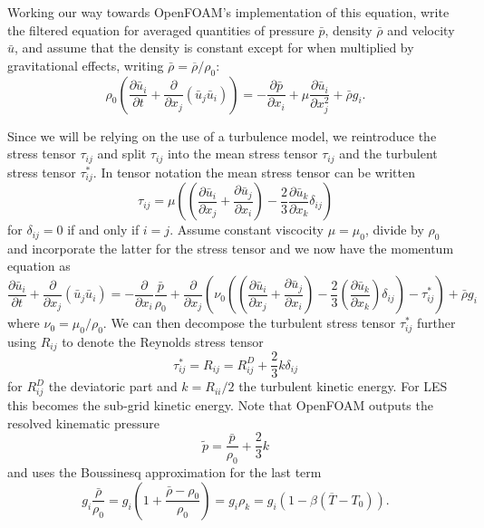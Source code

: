 \documentclass[12pt]{report}
\begin{document}
Working our way towards OpenFOAM's implementation of this equation, write the filtered equation for averaged quantities of pressure $\bar{p}$, density $\bar{\rho}$ and velocity $\bar{u}$, and assume that the density is constant except for when multiplied by gravitational effects, writing $\bar{\rho} = \overline{\rho} / \rho _0$:
\begin{equation} \rho _0 \left ( \frac{\partial \bar{u}_i}{\partial t} + \frac{\partial}{\partial x_j} \left( \bar{u}_j \bar{u}_i \right) \right )
= -\frac{\partial \bar{p}} {\partial{x_i}} +  \mu \frac{\partial \bar{u}_i}{\partial x_j^2} + \bar{\rho} g_i. \end{equation}

Since we will be relying on the use of a turbulence model, we reintroduce the stress tensor $\tau _{ij}$ and split $\tau_{ij}$ into the mean stress tensor $\tau _{ij}$ and the turbulent stress tensor $\tau ^* _{ij}$.
In tensor notation the mean stress tensor can be written
\begin{equation*} \tau _{ij} = \mu \left ( \left ( \frac{\partial \bar{u} _i}{\partial x_j} + \frac{\partial \bar{u} _j }{\partial x_i} \right) - \frac{2}{3} \frac{\partial \bar{u}_k} {\partial x_k} \delta _{ij} \right ) \end{equation*}
for $\delta _{ij} = 0$ if and only if $i=j$.
Assume constant viscocity $\mu = \mu _0$, divide by $\rho _0$ and incorporate the latter for the stress tensor and we now have the momentum equation as
\begin{equation*} \frac{\partial \bar{u}_i}{\partial t} + \frac{\partial}{\partial x_j} \left( \bar{u}_j \bar{u}_i \right) 
= -\frac{\partial } {\partial{x_i}} \frac{\bar{p}}{\rho_0} + \frac{\partial }{\partial x_j} \left ( \nu _0 \left ( \left ( \frac{\partial \bar{u}_i} {\partial x_j} + \frac{\partial \bar{u} _j}{\partial x_i} \right ) - \frac{2}{3}\left ( \frac{\partial \bar{u} _k}{\partial x_k }\right ) \delta _{ij}\right ) - \tau ^* _{ij} \right ) + \bar{\rho} g_i \end{equation*}
where $\nu _0 = \mu _0 /\rho _0$.
We can then decompose the turbulent stress tensor $\tau ^* _{ij}$ further using $R_{ij}$ to denote the Reynolds stress tensor
\begin{equation*} \tau ^* _{ij} = R_{ij} = R^D _{ij} + \frac{2}{3} k \delta _{ij} \end{equation*}
for $R_{ij}^D$ the deviatoric part and $k = R_{ii}/2$ the turbulent kinetic energy.
For LES this becomes the sub-grid kinetic energy.
Note that OpenFOAM outputs the resolved kinematic pressure
\begin{equation*} \tilde{p} = \frac{\bar{p} }{\rho _0} + \frac{2}{3}k \end{equation*}
and uses the Boussinesq approximation for the last term
\begin{equation*} g_i\frac{\bar{\rho}}{\rho _0} = g_i \left ( 1 + \frac{\bar{\rho} - \rho _0}{\rho _0} \right ) = g_i \rho _k  = g_i \left (1 - \beta \left (\overline{T} - T _0\right ) \right ) .\end{equation*}
\end{document}
